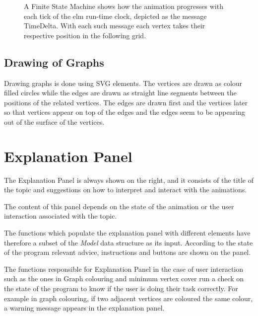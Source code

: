 \begin{figure}[ht] %
\centering %
\caption{ A Finite State Machine shows how the animation progresses with
          each tick of the elm run-time clock, depicted as the message TimeDelta.
          With each such message each vertex takes their
          respective position in the following grid.
        }
\label{fig: animationFSM}
\end{figure}
\subsection{Drawing of Graphs}
Drawing graphs is done using SVG elements. The vertices are drawn as colour
filled circles while the edges are drawn as straight line segments between the
positions of the related vertices. The edges are drawn first and the vertices
later so that vertices appear on top of the edges and the edges seem to be
appearing out of the surface of the vertices.

\section{Explanation Panel}

The Explanation Panel is always shown on the right, and it consists of the title of the topic and suggestions on how
to interpret and interact with the animations.

The content of this panel depends on the state of the animation or the user
interaction associated with the topic.

The functions which populate the explanation panel with different elements have
therefore a subset of the \emph{Model} data structure as its input.  According
to the state of the program relevant advice, instructions and buttons are
shown on the panel.

The functions responsible for Explanation Panel in the case of user interaction
such as the ones in Graph colouring and minimum vertex cover run a check on the
state of the program to know if the user is doing their task correctly. For
example in graph colouring, if two adjacent vertices are coloured the same colour,
a warning message appears in the explanation panel.


